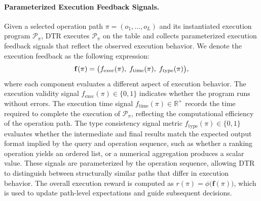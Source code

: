 \paragraph{Parameterized Execution Feedback Signals.}
Given a selected operation path $\pi = (o_1, \dots, o_L)$ and its instantiated execution program $\mathcal{P}_\pi$, DTR executes $\mathcal{P}_\pi$ on the table and collects parameterized execution feedback signals that reflect the observed execution behavior. We denote the execution feedback as the following expression:
\begin{equation}\small
\label{f_pi}
\mathbf{f}(\pi) = \big( f_{\text{exec}}(\pi),\; f_{\text{time}}(\pi),\; 
f_{\text{type}}(\pi) \big),
\end{equation}
where each component evaluates a different aspect of execution behavior. The execution validity signal $f_{\text{exec}}(\pi) \in \{0,1\}$ indicates whether the program runs without errors. The execution time signal $f_{\text{time}}(\pi) \in \mathbb{R}^+$ records the time required to complete the execution of $\mathcal{P}_\pi$, reflecting the computational efficiency of the operation path. The type consistency signal metric $f_{\text{type}}(\pi) \in \{0,1\}$ evaluates whether the intermediate and final results match the expected output format implied by the query and operation sequence, such as whether a ranking operation yields an ordered list, or a numerical aggregation produces a scalar value. These signals are parameterized by the operation sequence, allowing DTR to distinguish between structurally similar paths that differ in execution behavior. The overall execution reward is computed as $r(\pi) = \phi\big( \mathbf{f}(\pi) \big)$, which is used to update path-level expectations and guide subsequent decisions.


